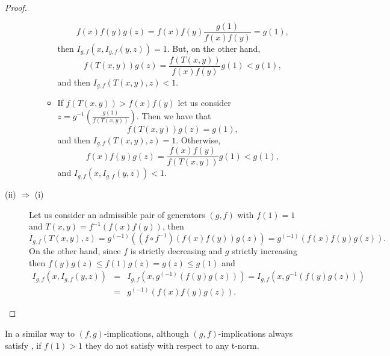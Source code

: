\begin{proof}
\begin{description}
\begin{itemize}
\begin{itemize}
			$$ f(x)f(y)g(z) = f(x)f(y) \frac{g(1)}{f(x)f(y)} = g(1),$$
			then $I_{g,f}(x,I_{g,f}(y,z))=1$. But, on the other hand,
			$$ f(T(x,y))g(z) = \frac{f(T(x,y))}{f(x)f(y)}g(1) < g(1),$$
			and then $I_{g,f}(T(x,y),z) < 1 $.
			\item If $ f(T(x,y)) > f(x)f(y)$ let us consider $ z= g^{-1} \left( \frac{g(1)}{f(T(x,y))}\right)$. Then we have that
			$$ f(T(x,y))g(z)=g(1),$$
			and then $I_{g,f}(T(x,y),z)=1$. Otherwise,
			$$ f(x)f(y)g(z) = \frac{f(x)f(y)}{f(T(x,y))} g(1) < g(1),$$
			and $ I_{g,f}(x,I_{g,f}(y,z)) < 1 $.
		\end{itemize}
	\end{itemize}
	\item[(ii) $ \Rightarrow$ (i)] Let us consider an admissible pair of generators $(g,f)$ with $f(1)=1$ and $T(x,y)=f^{-1}(f(x)f(y))$, then
	$$I_{g,f}(T(x,y),z)=g^{(-1)}((f\circ f^{-1})(f(x)f(y))g(z))=g^{(-1)}(f(x)f(y)g(z)).$$
	On the other hand, since $f$ is strictly decreasing and $g$ strictly increasing then $f(y)g(z) \leq f(1)g(z)=g(z) \leq g(1)$ and
	\begin{eqnarray*}
	I_{g,f}(x,I_{g,f}(y,z))&=&I_{g,f}(x,g^{(-1)}(f(y)g(z)))=I_{g,f}(x,g^{-1}(f(y)g(z))) \\
	&=&g^{(-1)}(f(x)f(y)g(z)).
	\end{eqnarray*}
	\end{description}
\end{proof}
In a similar way to $(f,g)$-implications, although $(g,f)$-implications always satisfy \EP, if $f(1) > 1$ they do not satisfy \LI with respect to any t-norm.

